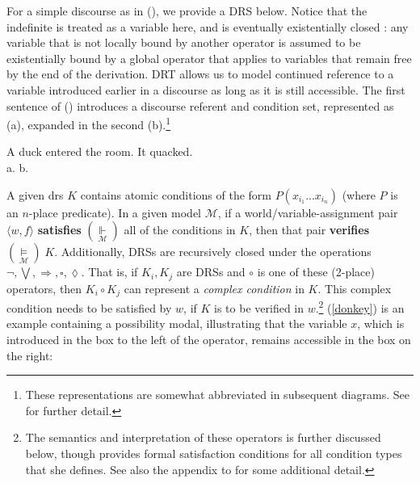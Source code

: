 For a simple discourse as in (\nextx), we provide a DRS below. Notice that the indefinite is treated as a variable here, and is eventually existentially closed \citep{Heim}: any variable that is not locally bound by another operator is assumed to be existentially bound by a global operator that applies to variables that remain free by the end of the derivation. DRT allows us to model continued reference to a variable introduced earlier in a discourse as long as it is still accessible. The first sentence of () introduces a discourse referent and condition set, represented as (a), expanded in the second (b).\footnote{These representations are somewhat abbreviated in subsequent diagrams. See \citet{Kamp1993} for further detail.}


	\pex A duck entered the room. It quacked.\\
		a.  \hspace*{1in}	b. 

	\xe
	

\vspace{1em}

A given \acrshort{drs} $ K $ contains atomic conditions of the form $ P(x_{i_1}...x_{i_n}) $ (where $ P $ is an $ n $-place predicate). In a given model $ \mathcal M $, if a world/variable-assignment pair $ \langle w,f\rangle $ \textbf{satisfies} $ (\underset{\scriptscriptstyle{\mathcal M}}{\boldsymbol{\Vdash}}) $ all of the conditions in $ K $, then that pair \textbf{verifies} $(\underset{\scriptscriptstyle{\mathcal M}}{\boldsymbol{\vDash}}) \;K$. Additionally, DRSs are recursively closed under the operations $ \neg,\bigvee,\Rightarrow,\square,\lozenge $. That is, if $ K_i,K_j $ are DRSs and $ \circ $ is one of these (2-place) operators, then $ K_i\circ K_j $ can represent a \textit{complex condition} in $ K $. This complex condition needs to be satisfied by $ w $, if $ K $ is to be verified in $ w $.\footnote{The semantics and interpretation of these operators is further discussed below, though \citet[714]{Roberts1989} provides formal satisfaction conditions for all condition types that she defines. See also the appendix to \citeauthor{PhilKotek} for some additional detail.} (\ref{donkey}) is an example containing a possibility modal, illustrating that the variable $x$, which is introduced in the box to the left of the operator, remains accessible in the box on the right: 


